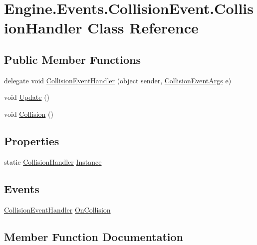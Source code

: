 \hypertarget{a00354}{}\section{Engine.\+Events.\+Collision\+Event.\+Collision\+Handler Class Reference}
\label{a00354}
\subsection*{Public Member Functions}
\begin{DoxyCompactItemize}
\item 
delegate void \hyperlink{a00354_a2e6e57bf1eda856c51464dfd560c2151}{Collision\+Event\+Handler} (object sender, \hyperlink{a00350}{Collision\+Event\+Args} e)
\item 
void \hyperlink{a00354_abfa92089bdf2aaa93c332e32737d4531}{Update} ()
\item 
void \hyperlink{a00354_a99ec43d39ea173a2a5897691228bea98}{Collision} ()
\end{DoxyCompactItemize}
\subsection*{Properties}
\begin{DoxyCompactItemize}
\item 
static \hyperlink{a00354}{Collision\+Handler} \hyperlink{a00354_a9106bf24803f79138e8cf42162c7ec82}{Instance}
\end{DoxyCompactItemize}
\subsection*{Events}
\begin{DoxyCompactItemize}
\item 
\hyperlink{a00354_a2e6e57bf1eda856c51464dfd560c2151}{Collision\+Event\+Handler} \hyperlink{a00354_aa1c9eb18623260839928ff18e8aa6e5b}{On\+Collision}
\end{DoxyCompactItemize}


\subsection{Member Function Documentation}
\mbox{\label{a00354_a99ec43d39ea173a2a5897691228bea98}} 
